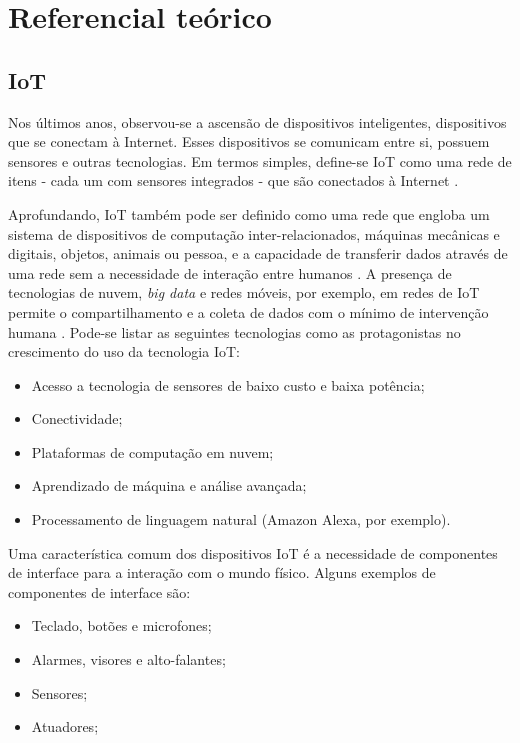 \chapter{Referencial teórico}\label{chapter:referencial_teorico}

\section{IoT}

Nos últimos anos, observou-se a ascensão de dispositivos inteligentes, dispositivos que se conectam à Internet. Esses dispositivos se comunicam entre si, possuem sensores e outras tecnologias. Em termos simples, define-se IoT como uma rede de itens - cada um com sensores integrados - que são conectados à Internet \cite{ref:003}.

Aprofundando, IoT também pode ser definido como uma rede que engloba um sistema de dispositivos de computação inter-relacionados, máquinas mecânicas e digitais, objetos, animais ou pessoa, e a capacidade de transferir dados através de uma rede sem a necessidade de interação entre humanos \cite{ref:004}. A presença de tecnologias de nuvem, \textit{big data} e redes móveis, por exemplo, em redes de IoT permite o compartilhamento e a coleta de dados com o mínimo de intervenção humana \cite{ref:005}. Pode-se listar as seguintes tecnologias como as protagonistas no crescimento do uso da tecnologia IoT:

\begin{itemize}
    \item Acesso a tecnologia de sensores de baixo custo e baixa potência;
    \item Conectividade;
    \item Plataformas de computação em nuvem;
    \item Aprendizado de máquina e análise avançada;
    \item Processamento de linguagem natural (Amazon Alexa, por exemplo).
\end{itemize}

Uma característica comum dos dispositivos IoT é a necessidade de componentes de interface para a interação com o mundo físico. Alguns exemplos de componentes de interface são:

\begin{itemize}
    \item Teclado, botões e microfones;
    \item Alarmes, visores e alto-falantes;
    \item Sensores;
    \item Atuadores;
\end{itemize}

